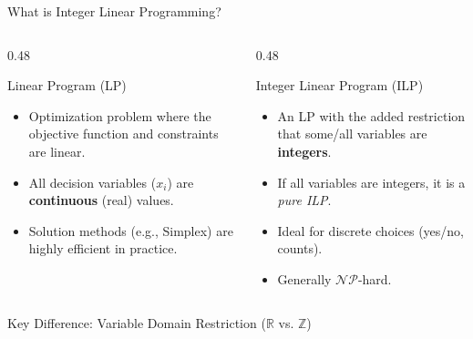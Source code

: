 \documentclass[aspectratio=169]{beamer}
\begin{document}
\begin{frame}{What is Integer Linear Programming?}
  \begin{columns}[T]
    \begin{column}{0.48\textwidth}
      \begin{block}{Linear Program (LP)}
        \begin{itemize}
          \item Optimization problem where the objective function and constraints are linear.
          \item All decision variables ($x_i$) are \textbf{continuous} (real) values.
          \item Solution methods (e.g., Simplex) are highly efficient in practice.
        \end{itemize}
      \end{block}
    \end{column}
    \begin{column}{0.48\textwidth}
      \begin{block}{Integer Linear Program (ILP)}
        \begin{itemize}
          \item An LP with the added restriction that some/all variables are \textbf{integers}.
          \item If all variables are integers, it is a \textit{pure ILP}.
          \item Ideal for discrete choices (yes/no, counts).
          \item Generally $\mathcal{NP}$-hard.
        \end{itemize}
      \end{block}
    \end{column}
  \end{columns}

  \vspace{0.5em}
  \centering
  \alert{Key Difference: Variable Domain Restriction ($\mathbb{R}$ vs. $\mathbb{Z}$)}
\end{frame}
\end{document}
